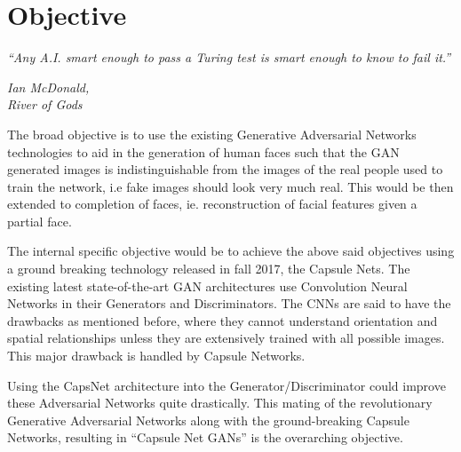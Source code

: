 \chapter{Objective}\label{ch:objective}
\epigraph{\textit{\normalsize “Any A.I. smart enough to pass a Turing test is smart enough to know to fail it.”}}{\textit{ \normalsize Ian McDonald,\\ River of Gods}}
The broad objective is to use the existing Generative Adversarial Networks technologies to aid in the generation of human faces such that the GAN generated images is indistinguishable from the images of the real people used to train the network, i.e fake images should look very much real. This would be then extended to completion of faces, ie. reconstruction of facial features given a partial face.\par\bigskip
The internal specific objective would be to achieve the above said objectives using a ground breaking technology released in fall 2017, the Capsule Nets. The existing latest state-of-the-art GAN architectures use Convolution Neural Networks in their Generators and Discriminators. The CNNs are said to have the drawbacks as mentioned before, where they cannot understand orientation and spatial relationships unless they are extensively trained with all possible images. This major drawback is handled by Capsule Networks.
\par\bigskip
Using the CapsNet architecture into the Generator/Discriminator could improve these Adversarial Networks quite drastically. This mating of the revolutionary Generative Adversarial Networks along with the ground-breaking Capsule Networks, resulting in “Capsule Net GANs” is the overarching objective.
